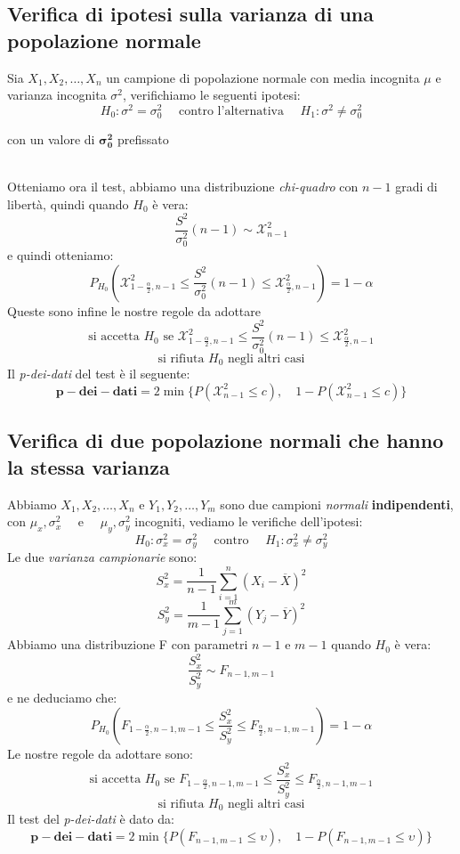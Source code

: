 \documentclass[]{article}
\begin{document}
    \subsection{Verifica di ipotesi sulla varianza di una popolazione normale}
    Sia $X_1, X_2, \ldots, X_n$ un campione di popolazione normale con media incognita $\mu$ e varianza incognita $\sigma^2$, verifichiamo le seguenti ipotesi:
    \[ H_0 : \sigma^2 = \sigma^2_0 \quad \text{ contro l'alternativa } \quad H_1 : \sigma^2 \not = \sigma^2_0 \]
    \centerline{con un valore di $\boldsymbol{\sigma^2_0}$ prefissato} \\[2ex]
    Otteniamo ora il test, abbiamo una distribuzione \textit{chi-quadro} con $n-1$ gradi di libertà, quindi quando $H_0$ è vera:\
    \[ \frac{S^2}{\sigma^2_0}(n-1) \sim \mathcal{X}^2_{n-1} \]
    e quindi otteniamo:
\    \[ P_{H_0} \left( \mathcal{X}^2_{1- \frac{\alpha}{2}, n-1} \leq \frac{S^2}{\sigma^2_0} (n-1) \leq \mathcal{X}^2_{\frac{\alpha}{2}, n -1} \right) = 1 - \alpha \]
    Queste sono infine le nostre regole da adottare
    \[ \text{si accetta } H_0 \text{ se } \mathcal{X}^2_{1-\frac{\alpha}{2}, n-1} \leq \frac{S^2}{\sigma^2_0} (n-1) \leq \mathcal{X}^2_{\frac{\alpha}{2}, n-1} \]
    \[ \text{si rifiuta } H_0 \text{ negli altri casi} \]
    Il \textit{p-dei-dati} del test è il seguente:
    \[ \boldsymbol{p-dei-dati} = 2 \min \{P(\mathcal{X}^2_{n-1} \leq c), \quad 1-P(\mathcal{X}^2_{n-1} \leq c)\} \]
    \subsection{Verifica di due popolazione normali che hanno la stessa varianza}
    Abbiamo $X_1, X_2, \ldots, X_n$ e $Y_1, Y_2,\ldots, Y_m$ sono due campioni \textit{normali} \textbf{indipendenti}, con $\mu_x, \sigma^2_x \quad$ e $\quad \mu_y, \sigma^2_y$ incogniti, vediamo le verifiche dell'ipotesi:
    \[ H_0 : \sigma^2_x = \sigma^2_y \quad \text{ contro } \quad H_1 : \sigma^2_x \not = \sigma^2_y \]
    Le due \textit{varianza campionarie} sono:
    \[ S^2_x = \frac{1}{n-1} \sum_{i=1}^{n} (X_i - \overline{X})^2 \]
    \[ S^2_y = \frac{1}{m-1} \sum_{j=1}^{m} (Y_j - \overline{Y})^2 \]
    Abbiamo una distribuzione F con parametri $n-1$ e $m-1$ quando $H_0$ è vera:
    \[ \frac{S^2_x}{S^2_y} \sim F_{n-1, m-1} \]
    e ne deduciamo che:
    \[ P_{H_0} \left( F_{1- \frac{\alpha}{2}, n-1, m-1} \leq \frac{S^2_x}{S^2_y} \leq F_{\frac{\alpha}{2}, n-1, m-1} \right) = 1 - \alpha \]
    Le nostre regole da adottare sono:
    \[ \text{si accetta } H_0 \text{ se } F_{1-\frac{\alpha}{2}, n-1, m-1} \leq \frac{S^2_x}{S^2_y} \leq F_{\frac{\alpha}{2}, n-1, m-1} \]
    \[ \text{si rifiuta } H_0 \text{ negli altri casi} \]
    Il test del \textit{p-dei-dati} è dato da:
    \[ \boldsymbol{p-dei-dati} = 2\min \{ P(F_{n-1,m-1} \leq \upsilon), \quad 1-P(F_{n-1,m-1} \leq \upsilon )\} \]
\end{document}

